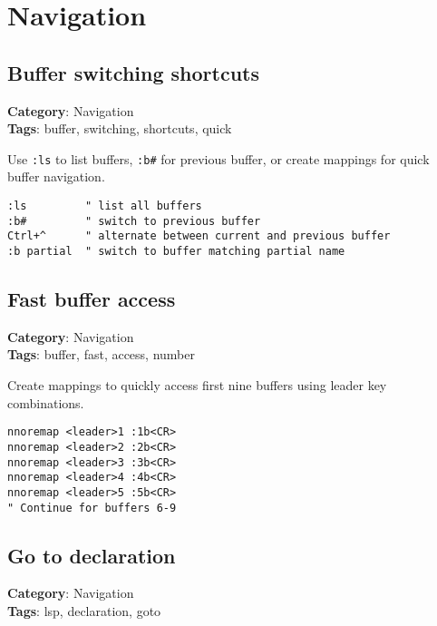 {{{{{{{{\chapter{Navigation}
\section{Buffer switching shortcuts}

\textbf{Category}: Navigation\\ \textbf{Tags}: buffer, switching, shortcuts, quick
\vspace{0.5cm}

Use {\footnotesize \Verb§:ls§} to list buffers, {\footnotesize \Verb§:b#§} for previous buffer, or create mappings for quick buffer navigation.

\begin{Exa*}{}
\begin{Verbatim}[fontsize=\footnotesize, breaklines, breakanywhere]
:ls         " list all buffers
:b#         " switch to previous buffer
Ctrl+^      " alternate between current and previous buffer
:b partial  " switch to buffer matching partial name
\end{Verbatim}
\end{Exa*}

\section{Fast buffer access}

\textbf{Category}: Navigation\\ \textbf{Tags}: buffer, fast, access, number
\vspace{0.5cm}

Create mappings to quickly access first nine buffers using leader key combinations.

\begin{Exa*}{}
\begin{Verbatim}[fontsize=\footnotesize, breaklines, breakanywhere]
nnoremap <leader>1 :1b<CR>
nnoremap <leader>2 :2b<CR>
nnoremap <leader>3 :3b<CR>
nnoremap <leader>4 :4b<CR>
nnoremap <leader>5 :5b<CR>
" Continue for buffers 6-9
\end{Verbatim}
\end{Exa*}

\section{Go to declaration}

\textbf{Category}: Navigation\\ \textbf{Tags}: lsp, declaration, goto
\vspace{0.5cm}

}}}}}}}}
